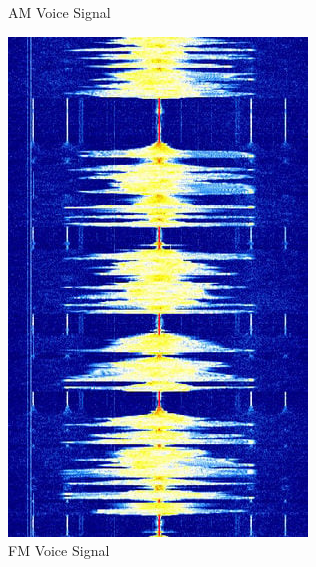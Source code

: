 \begin{figure}[h]
\begin{subfigure}[b]{0.2\textwidth}
        \caption{AM Voice Signal}
        \label{fig:am_voice}
    \end{subfigure}
    \hspace{1em}
    \begin{subfigure}[b]{0.2\textwidth}
        \centering
        \includegraphics[width=\textwidth]{assets/osi/physical/signals/fm_voice.png}
        \caption{FM Voice Signal}
        \label{fig:fm_voice}
    \end{subfigure}
    \hspace{1em}
    \begin{subfigure}[b]{0.2\textwidth}
        \centering

\end{subfigure}
\end{figure}

